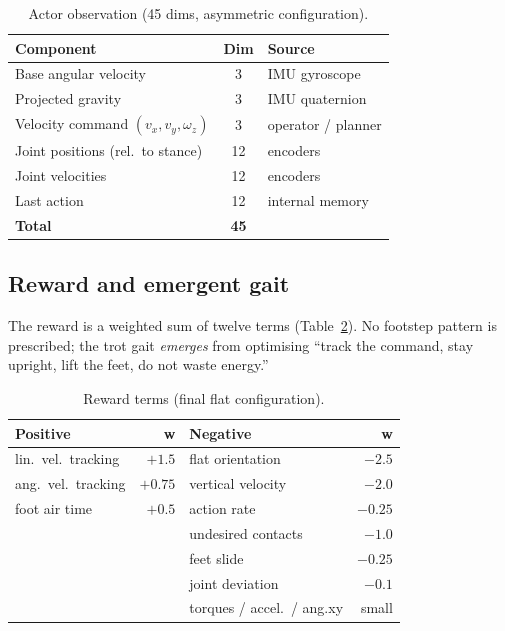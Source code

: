 \documentclass[conference]{IEEEtran}
\begin{document}
\begin{table}[t]
\caption{Actor observation (45 dims, asymmetric configuration).}
\label{tab:obs}
\centering
\footnotesize
\begin{tabular}{l c l}
\toprule
\textbf{Component} & \textbf{Dim} & \textbf{Source} \\
\midrule
Base angular velocity & 3 & IMU gyroscope \\
Projected gravity & 3 & IMU quaternion \\
Velocity command $(v_x,v_y,\omega_z)$ & 3 & operator / planner \\
Joint positions (rel.\ to stance) & 12 & encoders \\
Joint velocities & 12 & encoders \\
Last action & 12 & internal memory \\
\midrule
\textbf{Total} & \textbf{45} & \\
\bottomrule
\end{tabular}
\end{table}

\subsection{Reward and emergent gait}
The reward is a weighted sum of twelve terms (Table~\ref{tab:reward}). No footstep pattern is
prescribed; the trot gait \emph{emerges} from optimising ``track the command, stay upright, lift
the feet, do not waste energy.''

\begin{table}[t]
\caption{Reward terms (final flat configuration).}
\label{tab:reward}
\centering
\footnotesize
\begin{tabular}{l r | l r}
\toprule
\textbf{Positive} & \textbf{w} & \textbf{Negative} & \textbf{w} \\
\midrule
lin.\ vel.\ tracking & $+1.5$ & flat orientation & $-2.5$ \\
ang.\ vel.\ tracking & $+0.75$ & vertical velocity & $-2.0$ \\
foot air time & $+0.5$ & action rate & $-0.25$ \\
& & undesired contacts & $-1.0$ \\
& & feet slide & $-0.25$ \\
& & joint deviation & $-0.1$ \\
& & torques / accel.\ / ang.xy & small \\
\bottomrule
\end{tabular}
\end{table}
\end{document}
